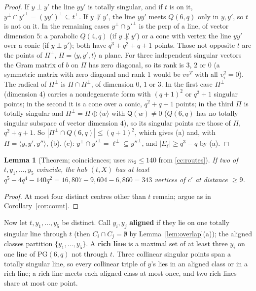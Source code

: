 \documentclass[11pt]{amsart}
\theoremstyle{plain}
\newtheorem{lemma}{Lemma}[section]
\theoremstyle{definition}
\theoremstyle{remark}
\newcommand{\PG}{\mathrm{PG}}
\newcommand{\Q}{\mathsf{Q}}
\newcommand{\ip}{\perp}
\begin{document}
\begin{proof}
If $y \ip y'$ the line $yy'$ is totally singular, and if $t$ is on it, $y^\perp \cap y'^\perp = (yy')^\perp \subseteq
t^\perp$. If $y \not\ip y'$, the line $yy'$ meets $Q(6,q)$ only in $y, y'$, so $t$ is not on it. In the remaining cases
$y^\perp \cap y'^\perp$ is the perp of a line, of vector dimension $5$: a parabolic $Q(4,q)$ (if $y \not\ip y'$) or a
cone with vertex the line $yy'$ over a conic (if $y \ip y'$); both have $q^3 + q^2 + q + 1$ points. Those not opposite $t$
are the points of $\Pi^\perp$, $\Pi = \langle y, y', t\rangle$ a plane. For three independent singular vectors the Gram
matrix of $b$ on $\Pi$ has zero diagonal, so its rank is $3$, $2$ or $0$ (a symmetric matrix with zero diagonal and
rank $1$ would be $vv^{T}$ with all $v_i^2 = 0$). The radical of $\Pi^\perp$ is $\Pi \cap \Pi^\perp$, of dimension
$0$, $1$ or $3$. In the first case $\Pi^\perp$ (dimension $4$) carries a nondegenerate form with $(q+1)^2$ or $q^2+1$
singular points; in the second it is a cone over a conic, $q^2+q+1$ points; in the third $\Pi$ is totally singular and
$\Pi^\perp = \Pi \oplus \langle w\rangle$ with $\Q(w) \ne 0$ ($Q(6,q)$ has no totally singular subspace of vector
dimension $4$), so its singular points are those of $\Pi$, $q^2+q+1$. So $|\Pi^\perp \cap Q(6,q)| \le (q+1)^2$, which
gives (a) and, with $\Pi = \langle y, y', y''\rangle$, (b). (c): $y^\perp \cap y'^\perp = \ell^\perp \subseteq y''^\perp$,
and $|E_\ell| \ge q^3 - q$ by (a).
\end{proof}

\begin{lemma}[Theorem; coincidences; uses $m_2 \le 140$ from \ref{cc:routes}]\label{lem:coinc}
If two of $t, y_1, \dots, y_5$ coincide, the hub $(t,X)$ has at least
$q^5 - 4q^4 - 140q^2 = 16{,}807 - 9{,}604 - 6{,}860 = 343$ vertices of $c'$ at distance $\ge 9$.
\end{lemma}

\begin{proof}
At most four distinct centres other than $t$ remain; argue as in Corollary~\ref{cor:count}.
\end{proof}

Now let $t, y_1, \dots, y_5$ be distinct. Call $y_i, y_j$ \textbf{aligned} if they lie on one totally singular line
through $t$ (then $C_i \cap C_j = \emptyset$ by Lemma~\ref{lem:overlap}(a)); the aligned classes partition
$\{y_1, \dots, y_5\}$. A \textbf{rich line} is a maximal set of at least three $y_i$ on one line of $\PG(6,q)$ not
through $t$. Three collinear singular points span a totally singular line, so every collinear triple of $y$'s lies in an
aligned class or in a rich line; a rich line meets each aligned class at most once, and two rich lines share at most one
point.
\end{document}
